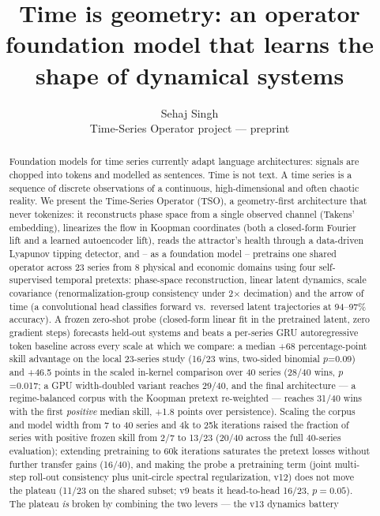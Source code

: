 \documentclass[11pt]{article}
\title{\textbf{Time is geometry: an operator foundation model that learns the shape of dynamical systems}}
\author{Sehaj Singh\\
{\small Time-Series Operator project --- preprint}}
\date{}
\begin{document}
\maketitle

\begin{abstract}
\noindent
Foundation models for time series currently adapt language architectures:
signals are chopped into tokens and modelled as sentences. Time is not text.
A time series is a sequence of discrete observations of a continuous,
high-dimensional and often chaotic reality. We present the Time-Series Operator
(TSO), a geometry-first architecture that never tokenizes: it reconstructs
phase space from a single observed channel (Takens' embedding), linearizes the
flow in Koopman coordinates (both a closed-form Fourier lift and a learned
autoencoder lift), reads the attractor's health through a data-driven
Lyapunov tipping detector, and -- as a foundation model -- pretrains one
shared operator across 23 series from 8 physical and economic domains using
four self-supervised temporal pretexts: phase-space reconstruction, linear
latent dynamics, scale covariance (renormalization-group consistency under
2$\times$ decimation) and the arrow of time (a convolutional head classifies
forward vs.\ reversed latent trajectories at 94--97\% accuracy). A frozen
zero-shot probe (closed-form linear fit in the pretrained latent, zero
gradient steps) forecasts held-out systems and beats a per-series GRU
autoregressive token baseline across every scale at which we compare: a
median +68 percentage-point skill advantage on the local 23-series study
(16/23 wins, two-sided binomial $p$=0.09) and +46.5 points in the scaled
in-kernel comparison over 40 series (28/40 wins, $p$=0.017; a GPU
width-doubled variant reaches 29/40, and the final architecture --- a
regime-balanced corpus with the Koopman pretext re-weighted --- reaches
31/40 wins with the first \emph{positive} median skill, +1.8 points
over persistence). Scaling the corpus and model width
from 7 to 40 series and 4k to 25k iterations
raised the fraction of series with positive frozen skill from 2/7 to
13/23 (20/40 across the full 40-series evaluation); extending
pretraining to 60k iterations saturates the pretext losses without
further transfer gains (16/40), and making the probe a pretraining term
(joint multi-step roll-out consistency plus unit-circle spectral
regularization, v12) does not move the plateau (11/23 on the shared
subset; v9 beats it head-to-head 16/23, $p=0.05$). The plateau \emph{is}
broken by combining the two levers --- the v13 dynamics battery

\end{abstract}
\end{document}
